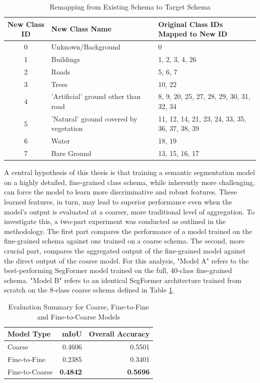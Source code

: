 \documentclass{report}
\begin{document}
\begin{table}[H]
\centering
\caption{Remapping from Existing Schema to Target Schema}
\label{tab:remapping_schema_simple}
\begin{tabular}{ c l p{5cm} }
\hline
\textbf{New Class ID} & \textbf{New Class Name} & \textbf{Original Class IDs Mapped to New ID} \\
\hline
0 & Unknown/Background & 0 \\
\hline
1 & Buildings & 1, 2, 3, 4, 26 \\
\hline
2 & Roads & 5, 6, 7 \\
\hline
3 & Trees & 10, 22 \\
\hline
4 & 'Artificial' ground other than road & 8, 9, 20, 25, 27, 28, 29, 30, 31, 32, 34 \\
\hline
5 & 'Natural' ground covered by vegetation & 11, 12, 14, 21, 23, 24, 33, 35, 36, 37, 38, 39 \\
\hline
6 & Water & 18, 19 \\
\hline
7 & Bare Ground & 13, 15, 16, 17 \\
\hline
\end{tabular}
\end{table}

A central hypothesis of this thesis is that training a semantic segmentation model on a highly detailed, fine-grained class schema, while inherently more challenging, can force the model to learn more discriminative and robust features. These learned features, in turn, may lead to superior performance even when the model's output is evaluated at a coarser, more traditional level of aggregation. To investigate this, a two-part experiment was conducted as outlined in the methodology. The first part compares the performance of a model trained on the fine-grained schema against one trained on a coarse schema. The second, more crucial part, compares the aggregated output of the fine-grained model against the direct output of the coarse model.
For this analysis, "Model A" refers to the best-performing SegFormer model trained on the full, 40-class fine-grained schema. "Model B" refers to an identical SegFormer architecture trained from scratch on the 8-class coarse schema defined in Table \ref{tab:remapping_schema_simple}.


\begin{table}[H]
\centering
\caption{Evaluation Summary for Coarse, Fine-to-Fine and Fine-to-Coarse Models}
\label{tab:evaluation_fine_to_coarse}
\begin{tabular}{lrr}
\toprule
    Model Type &   mIoU &  Overall Accuracy \\
\midrule
        Coarse & 0.4606 &            0.5501 \\
        Fine-to-Fine & 0.2385 & 0.3401 \\
Fine-to-Coarse & \textbf{0.4842} &            \textbf{0.5696} \\
\bottomrule
\end{tabular}
\end{table}
\end{document}
